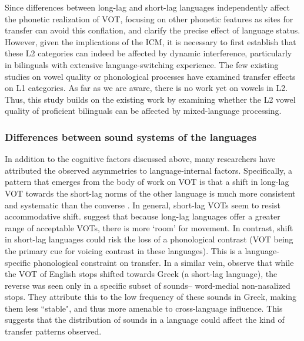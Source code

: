 \documentclass[12 pt]{article}
\begin{document}
Since differences between long-lag and short-lag languages independently affect the phonetic realization of VOT, focusing on other phonetic features as sites for transfer can avoid this conflation, and clarify the precise effect of language status. However, given the implications of the ICM, it is necessary to first establish that these L2 categories can indeed be affected by dynamic interference, particularly in bilinguals with extensive language-switching experience. The few existing studies on vowel quality \citep{simonet2014phonetic,muldner2019phonetics,elias2017effects} or phonological processes \citep{simonet2020increased,schwartz2015language} have examined transfer effects on L1 categories. As far as we are aware, there is no work yet on vowels in L2. Thus, this study builds on the existing work by examining whether the L2 vowel quality of proficient bilinguals can be affected by mixed-language processing.

\subsubsection*{Differences between sound systems of the languages} \label{sound systems} In addition to the cognitive factors discussed above, many researchers have attributed the observed asymmetries to language-internal factors. Specifically, a pattern that emerges from the body of work on VOT is that a shift in long-lag VOT towards the short-lag norms of the other language is much more consistent and systematic than the converse \citep{tobin2017phonetic, olson2016role,bullock2009trying,antoniou2011inter,chang2012rapid}. In general, short-lag VOTs seem to resist accommodative shift. \cite{bullock2009trying} suggest that because long-lag languages offer a greater range of acceptable VOTs, there is more `room' for movement. In contrast, shift in short-lag languages could risk the loss of a phonological contrast (VOT being the primary cue for voicing contrast in these languages).  This is a language-specific phonological constraint on transfer.
In a similar vein, \cite{antoniou2011inter} observe that while the VOT of English stops shifted towards Greek (a short-lag language), the reverse was seen only in a specific subset of sounds-- word-medial non-nasalized stops. They attribute this to the low frequency of these sounds in Greek, making them less ``stable", and thus more amenable to cross-language influence. This suggests that the distribution of sounds in a language could affect the kind of transfer patterns observed.
\end{document}
